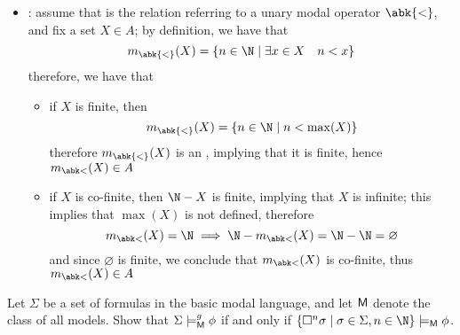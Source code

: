 \documentclass[a4paper, 12pt]{report}
\begin{document}
{\begin{itemize}
                \begin{itemize}
                    \item if $X$ is finite, then $\N - X$ is co-finite, hence $\N - X \in A$
                    \item if $X$ is co-finite, then $\N - X$ is finite, hence $\N - X \in A$
                \end{itemize}
            \item {}: assume that \curlyquotes{<} is the relation referring to a unary modal operator $\abk{<}$, and fix a set $X \in A$; by definition, we have that $$m_{\abk{<}}(X) = \{n \in \N \mid \exists x \in X \quad n < x\}$$ therefore, we have that

                \begin{itemize}
                    \item if $X$ is finite, then $$m_{\abk{<}}(X)= \{n \in \N \mid n < \max(X)\}$$ therefore $m_{\abk{<}}(X)$ is an , implying that it is finite, hence $m_{\abk <}(X) \in A$
                    \item if $X$ is co-finite, then $\N - X$ is finite, implying that $X$ is infinite; this implies that $\max (X)$ is not defined, therefore $$m_{\abk <}(X) = \N \implies \N - m_{\abk <}(X) = \N - \N = \varnothing$$ and since $\varnothing$ is finite, we conclude that $m_{\abk <}(X)$ is co-finite, thus $m_{\abk <}(X) \in A$
                \end{itemize}
        \end{itemize}
    }

     Let $\Sigma$ be a set of formulas in the basic modal language, and let $\textsf M$ denote the class of all models. Show that $\Sigma \models_{\textsf M}^g \phi$ if and only if $\{\Box ^n \sigma \mid \sigma \in \Sigma, n \in \N\} \models_{\textsf M} \phi$.
\end{document}
